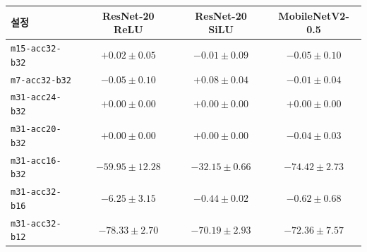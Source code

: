 \setlength{\tabcolsep}{5pt}
\begin{tabular}{lccc}
\toprule
설정 & ResNet-20 ReLU & ResNet-20 SiLU & MobileNetV2-0.5 \\
\midrule
\texttt{m15-acc32-b32} & $+0.02 \pm 0.05$ & $-0.01 \pm 0.09$ & $-0.05 \pm 0.10$ \\
\texttt{m7-acc32-b32} & $-0.05 \pm 0.10$ & $+0.08 \pm 0.04$ & $-0.01 \pm 0.04$ \\
\texttt{m31-acc24-b32} & $+0.00 \pm 0.00$ & $+0.00 \pm 0.00$ & $+0.00 \pm 0.00$ \\
\texttt{m31-acc20-b32} & $+0.00 \pm 0.00$ & $+0.00 \pm 0.00$ & $-0.04 \pm 0.03$ \\
\texttt{m31-acc16-b32} & $-59.95 \pm 12.28$ & $-32.15 \pm 0.66$ & $-74.42 \pm 2.73$ \\
\texttt{m31-acc32-b16} & $-6.25 \pm 3.15$ & $-0.44 \pm 0.02$ & $-0.62 \pm 0.68$ \\
\texttt{m31-acc32-b12} & $-78.33 \pm 2.70$ & $-70.19 \pm 2.93$ & $-72.36 \pm 7.57$ \\
\bottomrule
\end{tabular}
